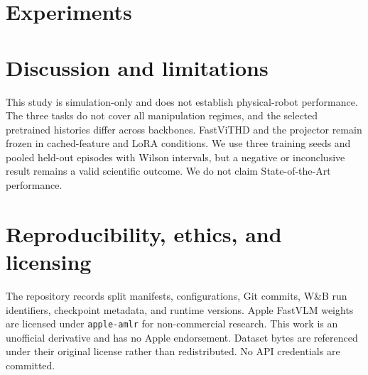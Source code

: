 \documentclass[10pt,letterpaper]{article}
\begin{document}
\section{Experiments}


\section{Discussion and limitations}
This study is simulation-only and does not establish physical-robot performance. The three tasks
do not cover all manipulation regimes, and the selected pretrained histories differ across
backbones. FastViTHD and the projector remain frozen in cached-feature and LoRA conditions. We use
three training seeds and pooled held-out episodes with Wilson intervals, but a negative or
inconclusive result remains a valid scientific outcome. We do not claim State-of-the-Art
performance.

\section{Reproducibility, ethics, and licensing}
The repository records split manifests, configurations, Git commits, W\&B run identifiers,
checkpoint metadata, and runtime versions. Apple FastVLM weights are licensed under
\texttt{apple-amlr} for non-commercial research. This work is an unofficial derivative and has no
Apple endorsement. Dataset bytes are referenced under their original license rather than
redistributed. No API credentials are committed.



\end{document}
